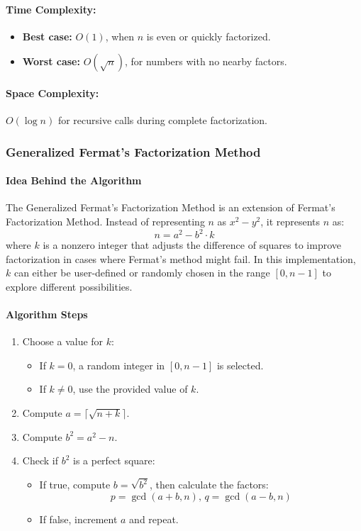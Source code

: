 \documentclass[12pt]{report}
\begin{document}
\paragraph{Time Complexity:}  
\begin{itemize}
    \item \textbf{Best case:} $O(1)$, when $n$ is even or quickly factorized.
    \item \textbf{Worst case:} $O(\sqrt{n})$, for numbers with no nearby factors.
\end{itemize}

\paragraph{Space Complexity:}  
$O(\log n)$ for recursive calls during complete factorization.

\subsubsection{Generalized Fermat’s Factorization Method}

\paragraph{Idea Behind the Algorithm}  

The Generalized Fermat’s Factorization Method is an extension of Fermat’s Factorization Method. Instead of representing $n$ as $x^2 - y^2$, it represents $n$ as:
\[
n = a^2 - b^2 \cdot k
\]
where $k$ is a nonzero integer that adjusts the difference of squares to improve factorization in cases where Fermat's method might fail. In this implementation, $k$ can either be user-defined or randomly chosen in the range $[0, n-1]$ to explore different possibilities.

\paragraph{Algorithm Steps}
\begin{enumerate}
    \item Choose a value for $k$:
    \begin{itemize}
        \item If $k = 0$, a random integer in $[0, n-1]$ is selected.
        \item If $k \neq 0$, use the provided value of $k$.
    \end{itemize}
    \item Compute $a = \lceil \sqrt{n + k} \rceil$.
    \item Compute $b^2 = a^2 - n$.
    \item Check if $b^2$ is a perfect square:
    \begin{itemize}
        \item If true, compute $b = \sqrt{b^2}$, then calculate the factors:
\[
        p = \gcd(a + b, n), \, q = \gcd(a - b, n)
\]
        \item If false, increment $a$ and repeat.
    \end{itemize}
\end{enumerate}
\end{document}
